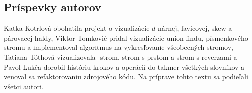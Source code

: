 \subsection{Príspevky autorov}
Katka Kotrlová obohatila projekt o vizualizácie $d$-nárnej, ľavicovej, skew a 
párovacej haldy, Viktor Tomkovič pridal vizualizácie union-findu, písmenkového 
stromu a implementoval algoritmus na vykresľovanie všeobecných stromov, 
Tatiana Tóthová vizualizovala \Bp-strom, strom s prstom a strom s reverzami 
a Pavol Lukča dorobil históriu krokov a operácií do takmer všetkých slovníkov 
a venoval sa refaktorovaniu zdrojového kódu. Na príprave tohto textu sa 
podieľali všetci autori.

